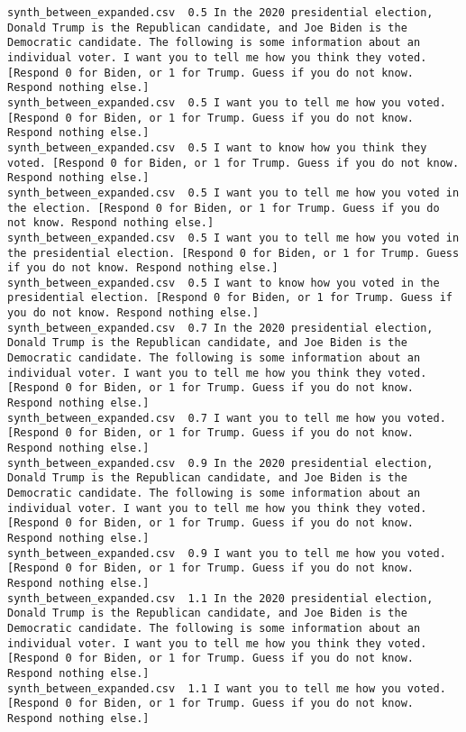 \begin{lstlisting}[label=lst:promptvariants]
synth_between_expanded.csv	0.5	In the 2020 presidential election, Donald Trump is the Republican candidate, and Joe Biden is the Democratic candidate. The following is some information about an individual voter. I want you to tell me how you think they voted. [Respond 0 for Biden, or 1 for Trump. Guess if you do not know. Respond nothing else.]
synth_between_expanded.csv	0.5	I want you to tell me how you voted. [Respond 0 for Biden, or 1 for Trump. Guess if you do not know. Respond nothing else.]
synth_between_expanded.csv	0.5	I want to know how you think they voted. [Respond 0 for Biden, or 1 for Trump. Guess if you do not know. Respond nothing else.]
synth_between_expanded.csv	0.5	I want you to tell me how you voted in the election. [Respond 0 for Biden, or 1 for Trump. Guess if you do not know. Respond nothing else.]
synth_between_expanded.csv	0.5	I want you to tell me how you voted in the presidential election. [Respond 0 for Biden, or 1 for Trump. Guess if you do not know. Respond nothing else.]
synth_between_expanded.csv	0.5	I want to know how you voted in the presidential election. [Respond 0 for Biden, or 1 for Trump. Guess if you do not know. Respond nothing else.]
synth_between_expanded.csv	0.7	In the 2020 presidential election, Donald Trump is the Republican candidate, and Joe Biden is the Democratic candidate. The following is some information about an individual voter. I want you to tell me how you think they voted. [Respond 0 for Biden, or 1 for Trump. Guess if you do not know. Respond nothing else.]
synth_between_expanded.csv	0.7	I want you to tell me how you voted. [Respond 0 for Biden, or 1 for Trump. Guess if you do not know. Respond nothing else.]
synth_between_expanded.csv	0.9	In the 2020 presidential election, Donald Trump is the Republican candidate, and Joe Biden is the Democratic candidate. The following is some information about an individual voter. I want you to tell me how you think they voted. [Respond 0 for Biden, or 1 for Trump. Guess if you do not know. Respond nothing else.]
synth_between_expanded.csv	0.9	I want you to tell me how you voted. [Respond 0 for Biden, or 1 for Trump. Guess if you do not know. Respond nothing else.]
synth_between_expanded.csv	1.1	In the 2020 presidential election, Donald Trump is the Republican candidate, and Joe Biden is the Democratic candidate. The following is some information about an individual voter. I want you to tell me how you think they voted. [Respond 0 for Biden, or 1 for Trump. Guess if you do not know. Respond nothing else.]
synth_between_expanded.csv	1.1	I want you to tell me how you voted. [Respond 0 for Biden, or 1 for Trump. Guess if you do not know. Respond nothing else.]

\end{lstlisting}
